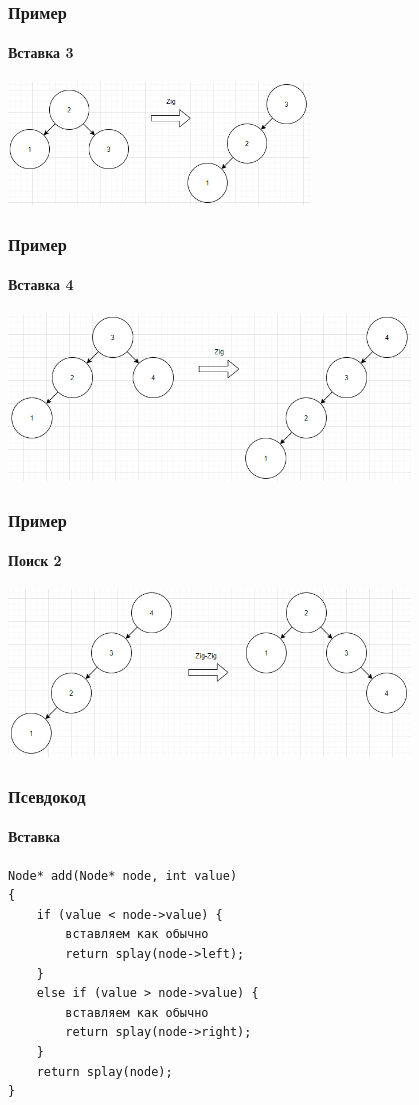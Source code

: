 \documentclass[xetex,mathserif,serif]{beamer}
\begin{document}
    \begin{frame}
        \frametitle{Пример}
        \framesubtitle{Вставка 3}
        \begin{center}
            \includegraphics[width=0.6\textwidth]{splay3.png}
        \end{center}
    \end{frame}

    \begin{frame}
        \frametitle{Пример}
        \framesubtitle{Вставка 4}
        \begin{center}
            \includegraphics[width=0.8\textwidth]{splay4.png}
        \end{center}
    \end{frame}

    \begin{frame}
        \frametitle{Пример}
        \framesubtitle{Поиск 2}
        \begin{center}
            \includegraphics[width=0.8\textwidth]{splaySearch.png}
        \end{center}
    \end{frame}

    \begin{frame}[fragile]
        \frametitle{Псевдокод}
        \framesubtitle{Вставка}
        \begin{verbatim}
Node* add(Node* node, int value)
{
    if (value < node->value) {
        вставляем как обычно
        return splay(node->left);
    }
    else if (value > node->value) {
        вставляем как обычно
        return splay(node->right);
    }
    return splay(node);
}
        \end{verbatim}
    \end{frame}
\end{document}
